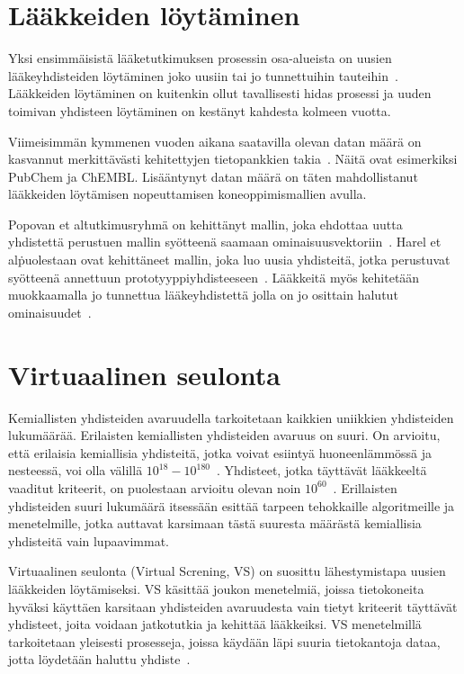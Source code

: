 \documentclass[finnish,twoside,censored,tkt,sw-line]{HYthesisML}
\begin{document}
\section{Lääkkeiden löytäminen}

Yksi ensimmäisistä lääketutkimuksen prosessin osa-alueista on uusien lääkeyhdisteiden löytäminen joko uusiin tai jo tunnettuihin tauteihin~\cite{EkinsSean2019Emlf}.
Lääkkeiden löytäminen on kuitenkin ollut tavallisesti hidas prosessi ja uuden toimivan yhdisteen löytäminen on kestänyt kahdesta kolmeen vuotta.

Viimeisimmän kymmenen vuoden aikana saatavilla olevan datan määrä on kasvannut merkittävästi kehitettyjen tietopankkien takia~\cite{EkinsSean2019Emlf}.
Näitä ovat esimerkiksi PubChem ja ChEMBL.\@
Lisääntynyt datan määrä on täten mahdollistanut lääkkeiden löytämisen nopeuttamisen koneoppimismallien avulla.

Popovan et al\. tutkimusryhmä on kehittänyt mallin, joka ehdottaa uutta yhdistettä perustuen mallin syötteenä saamaan ominaisuusvektoriin~\cite{PopovaMariya2018Drlf}.
Harel et al\.  puolestaan ovat kehittäneet mallin, joka luo uusia yhdisteitä, jotka perustuvat syötteenä annettuun prototyyppiyhdisteeseen~\cite{ShaharHarelAndKiraRadinsky}.
Lääkkeitä myös kehitetään muokkaamalla jo tunnettua lääkeyhdistettä jolla on jo osittain halutut ominaisuudet~\cite{ShaharHarelAndKiraRadinsky}.

\section{Virtuaalinen seulonta}

Kemiallisten yhdisteiden avaruudella tarkoitetaan kaikkien uniikkien yhdisteiden lukumäärää.
Erilaisten kemiallisten yhdisteiden avaruus on suuri.
On arvioitu, että erilaisia kemiallisia yhdisteitä, jotka voivat esiintyä huoneenlämmössä ja nesteessä, voi olla välillä \(10^{18} - 10^{180}\)~\cite{SotrifferChristoph2011VSPC}.
Yhdisteet, jotka täyttävät lääkkeeltä vaaditut kriteerit, on puolestaan arvioitu olevan noin \(10^{60}\)~\cite{SotrifferChristoph2011VSPC}.
Erillaisten yhdisteiden suuri lukumäärä itsessään esittää tarpeen tehokkaille algoritmeille ja menetelmille, jotka auttavat karsimaan tästä suuresta määrästä kemiallisia yhdisteitä vain lupaavimmat.

Virtuaalinen seulonta (Virtual Screning, VS) on suosittu lähestymistapa uusien lääkkeiden löytämiseksi.
VS käsittää joukon menetelmiä, joissa tietokoneita hyväksi käyttäen karsitaan yhdisteiden avaruudesta vain tietyt kriteerit täyttävät yhdisteet, joita voidaan jatkotutkia ja kehittää lääkkeiksi.
VS menetelmillä tarkoitetaan yleisesti prosesseja, joissa käydään läpi suuria tietokantoja dataa, jotta löydetään haluttu yhdiste~\cite{SotrifferChristoph2011VSPC}.
\end{document}
